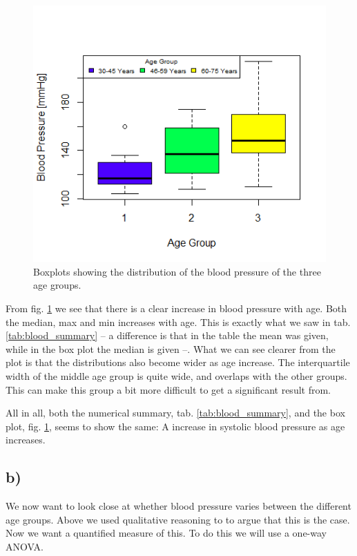 \documentclass[a4paper,norsk, 10pt]{article}
\begin{document}
\begin{figure}[!htbp]
\centering
\includegraphics[scale=0.8]{blood_box.png}
\caption{Boxplots showing the distribution of the blood pressure of the three age groups.}\label{fig:blood_box}
\end{figure}


From fig. \ref{fig:blood_box} we see that there is a clear increase in blood pressure with age. Both the median, max and min increases with age. This is exactly what we saw in tab. \ref{tab:blood_summary} -- a difference is that in the table the mean was given, while in the box plot the median is given --. What we can see clearer from the plot is that the distributions also become wider as age increase. The interquartile width of the middle age group is quite wide, and overlaps with the other groups. This can make this group a bit more difficult to get a significant result from.

All in all, both the numerical summary, tab. \ref{tab:blood_summary}, and the box plot, fig. \ref{fig:blood_box}, seems to show the same: A increase in systolic blood pressure as age increases.

\subsection*{b)}

We now want to look close at whether blood pressure varies between the different age groups. Above we used qualitative reasoning to to argue that this is the case. Now we want a quantified measure of this. To do this we will use a one-way ANOVA. 
\end{document}
